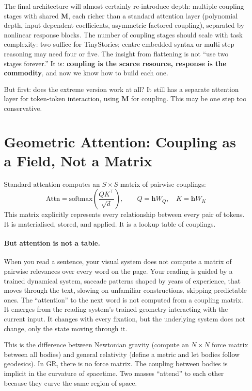 \documentclass[11pt, a4paper]{article}
\newcommand{\M}{\mathbf{M}}
\newcommand{\h}{\mathbf{h}}
\theoremstyle{plain}
\theoremstyle{definition}
\theoremstyle{remark}
\begin{document}
The final architecture will almost certainly re-introduce depth: multiple coupling stages with shared $\M$, each richer than a standard attention layer (polynomial depth, input-dependent coefficients, asymmetric factored coupling), separated by nonlinear response blocks.
The number of coupling stages should scale with task complexity: two suffice for TinyStories; centre-embedded syntax or multi-step reasoning may need four or five.
The insight from flattening is not ``use two stages forever.''
It is: \textbf{coupling is the scarce resource, response is the commodity}, and now we know how to build each one.

But first: does the extreme version work at all?
It still has a separate attention layer for token-token interaction, using $\M$ for coupling.
This may be one step too conservative.


\section{Geometric Attention: Coupling as a Field, Not a Matrix}
\label{sec:geometric-attention}

Standard attention computes an $S \times S$ matrix of pairwise couplings:
\begin{equation}
\text{Attn} = \text{softmax}\!\left(\frac{Q K^\top}{\sqrt{d}}\right), \qquad Q = \h W_Q, \quad K = \h W_K
\end{equation}
This matrix explicitly represents every relationship between every pair of tokens.
It is materialised, stored, and applied.
It is a lookup table of couplings.

\paragraph{But attention is not a table.}
When you read a sentence, your visual system does not compute a matrix of pairwise relevances over every word on the page.
Your reading is guided by a trained dynamical system, saccade patterns shaped by years of experience, that moves through the text, slowing on unfamiliar constructions, skipping predictable ones.
The ``attention'' to the next word is not computed from a coupling matrix.
It emerges from the reading system's trained geometry interacting with the current input.
It changes with every fixation, but the underlying system does not change, only the state moving through it.

This is the difference between Newtonian gravity (compute an $N \times N$ force matrix between all bodies) and general relativity (define a metric and let bodies follow geodesics).
In GR, there is no force matrix.
The coupling between bodies is implicit in the curvature of spacetime.
Two masses ``attend'' to each other because they curve the same region of space.
\end{document}
